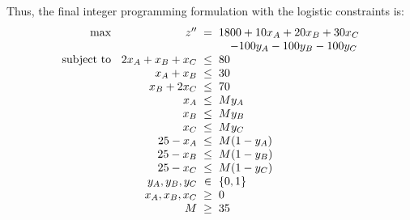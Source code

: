 \documentclass[a4paper, 10pt]{article}
\begin{document}
\begin{solution}
Thus, the final integer programming formulation with the logistic constraints is:
\[
\begin{array}{@{\hspace{2mm}} r @{\hspace{2mm}} r @{\hspace{2mm}} c @{\hspace{2mm}} l}
    \text{max } & z'' & = & 1800 + 10x_A + 20x_B + 30x_C \\
    & & & \quad - 100y_A - 100y_B - 100y_C \\
    \text{subject to } & 2x_A + x_B + x_C & \leq & 80 \\
    & x_A + x_B & \leq & 30 \\
    & x_B + 2x_C & \leq & 70 \\
    & x_A & \leq & M y_A \\
    & x_B & \leq & M y_B \\
    & x_C & \leq & M y_C \\
    & 25 - x_A & \leq & M (1 - y_A) \\
    & 25 - x_B & \leq & M (1 - y_B) \\
    & 25 - x_C & \leq & M (1 - y_C) \\
    & y_A, y_B, y_C & \in & \set{ 0, 1 } \\
    & x_A, x_B, x_C & \geq & 0 \\
    & M & \geq & 35 \\
\end{array}
\]
\end{solution}

\newpage
\end{document}
